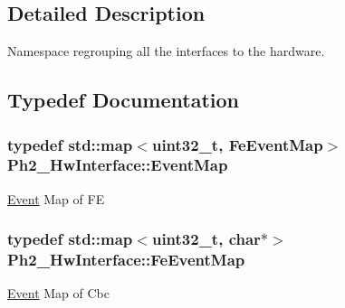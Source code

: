 \subsection{Detailed Description}
Namespace regrouping all the interfaces to the hardware. 

\subsection{Typedef Documentation}
\hypertarget{namespace_ph2___hw_interface_acf9f41d647e7a3ad9bae233b04b9e3bc}{
\subsubsection[{Event\-Map}]{\setlength{\rightskip}{0pt plus 5cm}typedef std\-::map$<$uint32\-\_\-t, {\bf Fe\-Event\-Map}$>$ {\bf Ph2\-\_\-\-Hw\-Interface\-::\-Event\-Map}}}\label{namespace_ph2___hw_interface_acf9f41d647e7a3ad9bae233b04b9e3bc}
\hyperlink{class_ph2___hw_interface_1_1_event}{Event} Map of F\-E \hypertarget{namespace_ph2___hw_interface_a50d97ee46941c2c0c2ecadc929e41b05}{
\subsubsection[{Fe\-Event\-Map}]{\setlength{\rightskip}{0pt plus 5cm}typedef std\-::map$<$uint32\-\_\-t, char$\ast$$>$ {\bf Ph2\-\_\-\-Hw\-Interface\-::\-Fe\-Event\-Map}}}\label{namespace_ph2___hw_interface_a50d97ee46941c2c0c2ecadc929e41b05}
\hyperlink{class_ph2___hw_interface_1_1_event}{Event} Map of Cbc 

